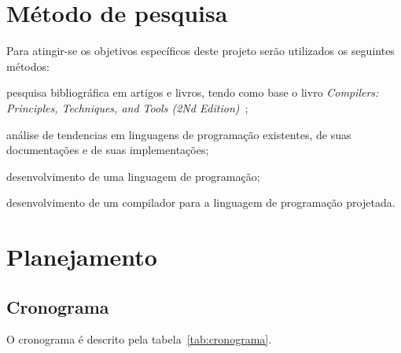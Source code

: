 \documentclass[
  12pt,
  openright,
  twoside,
  a4paper,
  english,
  brazil
]{abntex2}
\begin{document}
\chapter{Método de pesquisa}\label{cap:metodo_de_pesquisa}

Para atingir-se os objetivos específicos deste projeto serão utilizados os seguintes métodos:
\begin{alineas}
  \item pesquisa bibliográfica em artigos e livros, tendo como base o livro \textit{Compilers: Principles, Techniques, and Tools (2Nd Edition)}~\cite{Aho:2006:CPT:1177220};
  \item análise de tendencias em linguagens de programação existentes, de suas documentações e de suas implementações;
  \item desenvolvimento de uma linguagem de programação;
  \item desenvolvimento de um compilador para a linguagem de programação projetada.
\end{alineas}

\chapter{Planejamento}
\section{Cronograma}\label{cap:cronograma}

O cronograma é descrito pela tabela~\ref{tab:cronograma}.
\end{document}
